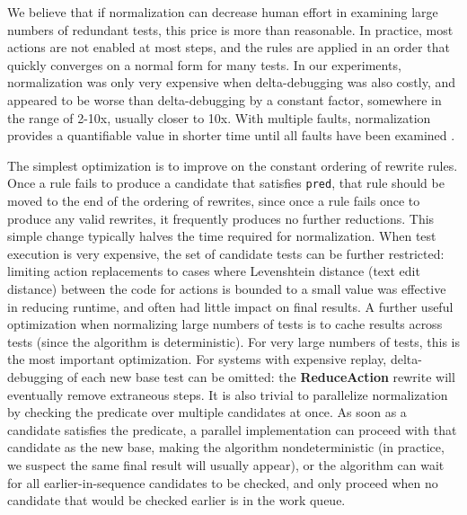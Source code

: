 We believe that if normalization can decrease human effort in
examining large numbers of redundant tests, this price is more
than reasonable.  In practice, most actions are not enabled at most
steps, and the rules are applied in an order that quickly converges on
a normal form for many tests.  In our experiments, normalization
was only very expensive when delta-debugging was also costly, and
appeared to be worse than delta-debugging by a constant factor,
somewhere in the range of 2-10x, usually closer to 10x.  With multiple
faults, normalization provides a quantifiable value in
shorter time until all faults have been examined \cite{PLDI13}.


The simplest optimization is to improve on the constant ordering of
rewrite rules.  Once a rule fails to produce a candidate that
satisfies {\tt pred}, that rule should be moved to the end of the
ordering of rewrites, since once a rule fails once to produce any
valid rewrites, it frequently produces no further reductions.  This
simple change typically halves the time required for normalization.
When test execution is very expensive, the set of candidate tests can be further restricted: limiting action replacements to cases
where Levenshtein \cite{Lev} distance (text edit distance) between the
code for actions is bounded to a small value was effective in
reducing runtime, and often had little impact on final results.
A further useful optimization when normalizing large numbers of tests
is to cache results across tests (since the algorithm is deterministic).   For very large
numbers of tests, this is the most important optimization.
For systems with
expensive replay, delta-debugging of each new base test
can be omitted: the {\bf ReduceAction} rewrite will
eventually remove extraneous steps.  
It is also trivial to parallelize normalization by
checking the predicate over multiple candidates at once.  As soon as a
candidate satisfies the predicate, a parallel implementation can proceed with that candidate as the new
base, making the algorithm nondeterministic (in practice, we suspect
the same final result will usually appear), or the algorithm can wait
for all earlier-in-sequence candidates to be checked, and only proceed
when no candidate that would be checked earlier is in the work queue.





